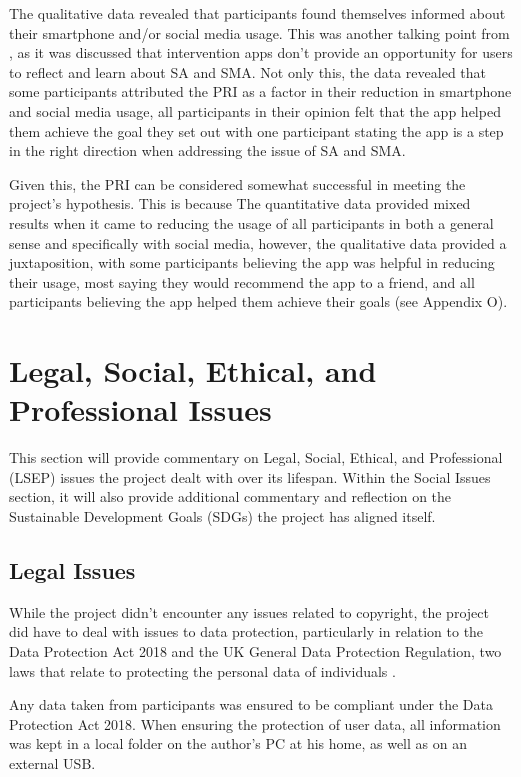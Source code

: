 \documentclass[12pt]{article}
\begin{document}
The qualitative data revealed that participants found themselves informed about their smartphone and/or social media usage. This was another talking point from 
, as it was discussed that intervention apps don't provide an opportunity for users to reflect and learn about SA and SMA. Not only this,
the data revealed that some participants attributed the PRI as a factor in their reduction in smartphone and social media usage, all participants in their opinion felt that the app
helped them achieve the goal they set out with one participant stating the app is a 
step in the right direction when addressing the issue of SA and SMA.\newline

Given this, the PRI can be considered somewhat successful in meeting the project's hypothesis. This is because The quantitative data provided mixed results when it came to reducing the 
usage of all participants in both a general sense and specifically with social media, however, the qualitative data provided a juxtaposition, with some participants believing the app was 
helpful in reducing their usage, most saying they would recommend the app to a friend, and all participants believing the app helped them achieve their goals (see Appendix O).


\newpage


\section{Legal, Social, Ethical, and Professional Issues}
This section will provide commentary on Legal, Social, Ethical, and Professional (LSEP) issues the project dealt with over its lifespan.
Within the Social Issues section, it will also provide additional commentary and reflection on the Sustainable Development Goals (SDGs)
the project has aligned itself.

\subsection{Legal Issues}
While the project didn't encounter any issues related to copyright, the project did have to deal with issues to data protection, particularly in
relation to the Data Protection Act 2018 and the UK General Data Protection Regulation, two laws that relate to protecting the personal data of
individuals . \newline

Any data taken from participants was ensured to be compliant under the Data Protection Act 2018. When ensuring the protection of 
user data, all information was kept in a local folder on the author's PC at his home, as well as on an external USB.\newline
\end{document}
